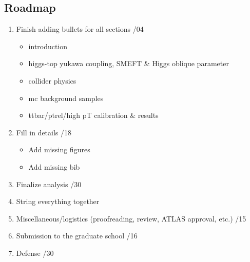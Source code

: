 \documentclass{msuphddissertation}
\begin{document}
\newpage
{}
\begin{doublespace}


{
\FormatChapterTitles  %



\chapter*{Roadmap}
\begin{enumerate}
\item Finish adding bullets for all sections /04
	\begin{itemize} Remaining
	\item introduction
	\item higgs-top yukawa coupling, SMEFT \& Higgs oblique parameter
	\item collider physics
	\item mc background samples
	\item ttbar/ptrel/high pT calibration \& results
	\end{itemize}
\item Fill in details /18
	\begin{itemize}
	\item Add missing figures
	\item Add missing bib
	\end{itemize}
\item Finalize analysis /30
\item String everything together
\item Miscellaneous/logistics (proofreading, review, ATLAS approval, etc.) /15
\item Submission to the graduate school /16
\item Defense /30
\end{enumerate}

}
\end{doublespace}
\end{document}
